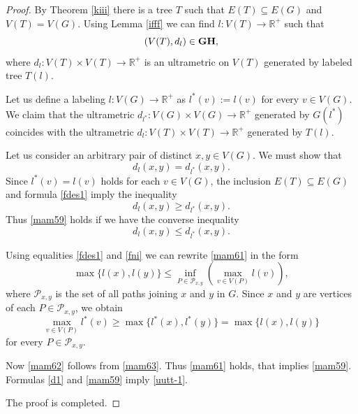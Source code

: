 \documentclass[pdflatex,sn-mathphys-num]{sn-jnl}%
\theoremstyle{thmstyleone}%
\theoremstyle{thmstyletwo}%
\theoremstyle{thmstylethree}%
\theoremstyle{thmstyletwo}%
\theoremstyle{thmstylethree}%
\begin{document}
\begin{proof}
By Theorem \ref{kiii} there is a tree $T$ such that
\(
E(T) \subseteq E(G)\) and \(V(T)=V(G).
\)
Using Lemma \ref{ifff} we can find 
\(
l: V(T) \to \mathbb{R}^+
\)
such that 
\begin{equation}
    \label{d1}
    (V(T), d_l) \in {\bf GH},
\end{equation}
where
\(
d_l : V(T)\times V(T)\to \mathbb{R}^+
\)
is an ultrametric on $V(T)$ generated by labeled tree $T(l)$.

Let us define a labeling \(
l : V(G)\to \mathbb{R}^+
\) as
$l^*(v) := l(v)$
for every $v \in V(G)$. We claim that the ultrametric $d_{l^*} : V(G) \times V(G) \to \mathbb{R}^+$ generated by $G(l^*)$ coincides with the ultrametric $d_l : V(T) \times V(T) \to \mathbb{R}^+$ generated by $T(l)$.




Let us consider an arbitrary pair of distinct $x,y \in V(G)$.  
We must show that
\begin{equation}
    \label{mam59}
d_l(x,y) = d_{l^*}(x,y). 
\end{equation}
Since $l^*(v) = l(v)$ holds for each $v \in V(G)$, the inclusion $E(T) \subseteq E(G)$ and formula \eqref{fdes1} imply the inequality
\begin{equation*}
d_l(x,y) \ge d_{l^*}(x,y). 
\end{equation*}
Thus \eqref{mam59} holds if we have the converse inequality
\begin{equation}
    \label{mam61}
d_l(x,y) \le d_{l^*}(x,y). 
\end{equation}

Using equalities \eqref{fdes1} and \eqref{fni} we can rewrite \eqref{mam61} in the form
\begin{equation}
    \label{mam62}
\max\{ l(x), l(y)\} \le \inf_{P\in \mathcal{P}_{x,y}}\left(\max_{v\in V(P)} l(v)\right),
\end{equation}
where $\mathcal{P}_{x,y}$ is the set of all paths joining $x$ and $y$ in $G$. Since $x$ and $y$ are vertices of each $P \in \mathcal{P}_{x,y}$, we obtain
\begin{equation}
    \label{mam63}
\max_{v \in V(P)} l^*(v) \ge \max\{l^*(x), l^*(y)\}
= \max\{l(x), l(y)\} 
\end{equation}
for every $P \in \mathcal{P}_{x,y}$.

Now \eqref{mam62} follows from \eqref{mam63}. Thus \eqref{mam61} holds, that implies \eqref{mam59}.
Formulas \eqref{d1} and \eqref{mam59} imply \eqref{uutt-1}. 

The proof is completed. 
\end{proof}
\end{document}
